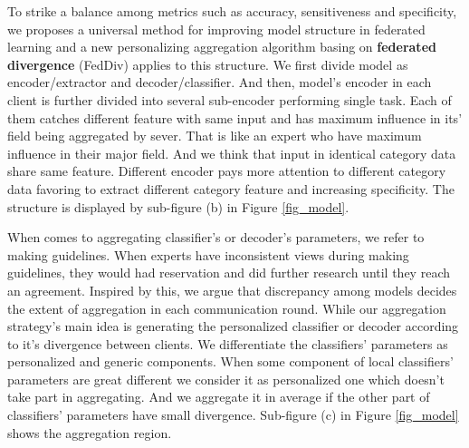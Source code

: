 \documentclass[journal]{IEEEtran}
\begin{document}


To strike a balance among metrics such as accuracy, sensitiveness and specificity, we proposes a universal method for improving model structure in federated learning and a new personalizing aggregation algorithm basing on \textbf{federated divergence} (FedDiv) applies to this structure. We first divide model as encoder/extractor and decoder/classifier. And then, model's encoder in each client is further divided into several sub-encoder performing single task. Each of them catches different feature with same input and has maximum influence in its' field being aggregated by sever. That is like an expert who have maximum influence in their major field. And we think that input in identical category data share same feature. Different encoder pays more attention to different category data favoring to extract different category feature and increasing specificity. The structure is displayed by sub-figure (b) in Figure \ref{fig_model}.

When comes to aggregating classifier's or decoder's parameters, we refer to making guidelines. When experts have inconsistent views during making guidelines, they would had reservation and did further research until they reach an agreement.  Inspired by this, we argue that discrepancy among models decides the extent of aggregation in each communication round. While our aggregation strategy's main idea is generating the personalized classifier or decoder according to it's divergence between clients. We differentiate the classifiers' parameters as personalized and generic components. When some component of local classifiers' parameters are great different we consider it as personalized one which doesn't take part in aggregating. And we aggregate it in average if the other part of classifiers' parameters have small divergence. Sub-figure (c) in Figure \ref{fig_model} shows the aggregation region.
\end{document}
